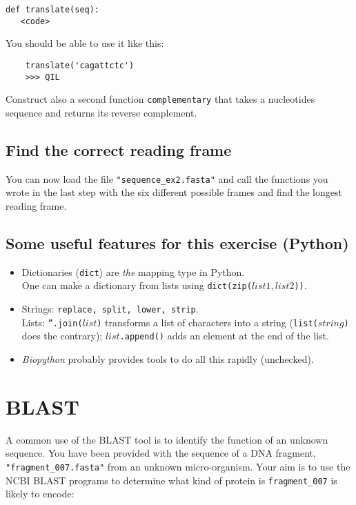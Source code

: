 \documentclass[a4paper,11pt]{article}
\begin{document}
\begin{verbatim}
def translate(seq): 
   <code>
\end{verbatim}

You should be able to use it like this:
\begin{verbatim}
	translate('cagattctc')
	>>> QIL
\end{verbatim}

Construct also a second function \texttt{complementary} that takes a nucleotides sequence and returns its reverse complement.

\subsection{Find the correct reading frame}
You can now load the file \texttt{"sequence\_ex2.fasta"} and call the functions you wrote in the last step with the six different possible frames and find the longest reading frame.

\subsection{Some useful features for this exercise (Python)}
\begin{itemize}
\item Dictionaries (\texttt{dict}) are \textit{the} mapping type in Python. \\
	  One can make a dictionary from lists using \texttt{dict(zip(}$list1,list2$\texttt{))}.
\item Strings: \texttt{replace, split, lower, strip}. \\
	  Lists: \texttt{''.join(}$list$\texttt{)} transforms a list of characters into a string (\texttt{list(}$string$\texttt{)} does the contrary); $list$\texttt{.append()} adds an element at the end of the list.
\item \textit{Biopython} probably provides tools to do all this rapidly (unchecked).
\end{itemize}


\section{BLAST}
A common use of the BLAST tool is to identify the function of an unknown sequence. You have been provided with the sequence of a DNA fragment, \texttt{"fragment\_007.fasta"} from an unknown micro-organism. Your aim is to use the NCBI BLAST programs to determine what kind of protein is \texttt{fragment\_007} is likely to encode:\\
\end{document}
